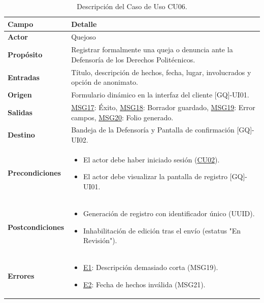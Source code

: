 \begin{appendices}
\begin{table}[htbp]
\centering
\small
\begin{tabular}{|p{3.5cm}|p{10.5cm}|}
\hline
\rowcolor[HTML]{EFEFEF} 
\textbf{Campo} & \textbf{Detalle} \\ \hline
\textbf{Actor} & Quejoso \\ \hline
\textbf{Propósito} & Registrar formalmente una queja o denuncia ante la Defensoría de los Derechos Politécnicos. \\ \hline
\textbf{Entradas} & Título, descripción de hechos, fecha, lugar, involucrados y opción de anonimato. \\ \hline
\textbf{Origen} & Formulario dinámico en la interfaz del cliente [GQ]-UI01. \\ \hline
\textbf{Salidas} & \hyperlink{msg:MSG17}{MSG17}: Éxito, \hyperlink{msg:MSG18}{MSG18}: Borrador guardado, \hyperlink{msg:MSG19}{MSG19}: Error campos, \hyperlink{msg:MSG20}{MSG20}: Folio generado. \\ \hline
\textbf{Destino} & Bandeja de la Defensoría y Pantalla de confirmación [GQ]-UI02. \\ \hline
\textbf{Precondiciones} & 
\begin{itemize}[nosep, leftmargin=*]
    \item El actor debe haber iniciado sesión (\hyperlink{anexo:casos_uso}{CU02}).
    \item El actor debe visualizar la pantalla de registro [GQ]-UI01.
\end{itemize} \\ \hline
\textbf{Postcondiciones} & 
\begin{itemize}[nosep, leftmargin=*]
    \item Generación de registro con identificador único (UUID).
    \item Inhabilitación de edición tras el envío (estatus "En Revisión").
\end{itemize} \\ \hline
\textbf{Errores} & 
\begin{itemize}[nosep, leftmargin=*]
    \item \hyperlink{err:E10}{E1}: Descripción demasiado corta (MSG19).
    \item \hyperlink{err:E11}{E2}: Fecha de hechos inválida (MSG21).
\end{itemize} \\ \hline
\end{tabular}
\caption{Descripción del Caso de Uso CU06.}
\label{tab:cu06_especificacion}
\end{table}


\end{appendices}

